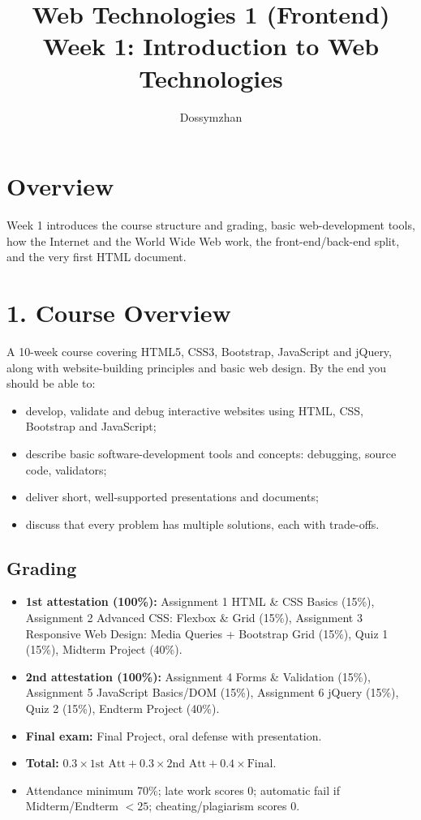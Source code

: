 \documentclass[12pt]{article}
\title{Web Technologies 1 (Frontend) \\ Week 1: Introduction to Web Technologies}
\author{Dossymzhan}
\date{}
\begin{document}
\maketitle

\section{Overview}
Week 1 introduces the course structure and grading, basic web-development tools, how the Internet and the World Wide Web work, the front-end/back-end split, and the very first HTML document.

\section{1. Course Overview}
A 10-week course covering HTML5, CSS3, Bootstrap, JavaScript and jQuery, along with website-building principles and basic web design. By the end you should be able to:
\begin{itemize}
    \item develop, validate and debug interactive websites using HTML, CSS, Bootstrap and JavaScript;
    \item describe basic software-development tools and concepts: debugging, source code, validators;
    \item deliver short, well-supported presentations and documents;
    \item discuss that every problem has multiple solutions, each with trade-offs.
\end{itemize}

\subsection{Grading}
\begin{itemize}
    \item \textbf{1st attestation (100\%):} Assignment 1 HTML \& CSS Basics (15\%), Assignment 2 Advanced CSS: Flexbox \& Grid (15\%), Assignment 3 Responsive Web Design: Media Queries + Bootstrap Grid (15\%), Quiz 1 (15\%), Midterm Project (40\%).
    \item \textbf{2nd attestation (100\%):} Assignment 4 Forms \& Validation (15\%), Assignment 5 JavaScript Basics/DOM (15\%), Assignment 6 jQuery (15\%), Quiz 2 (15\%), Endterm Project (40\%).
    \item \textbf{Final exam:} Final Project, oral defense with presentation.
    \item \textbf{Total:} $0.3 \times \text{1st Att} + 0.3 \times \text{2nd Att} + 0.4 \times \text{Final}$.
    \item Attendance minimum 70\%; late work scores 0; automatic fail if Midterm/Endterm $< 25$; cheating/plagiarism scores 0.
\end{itemize}
\end{document}
